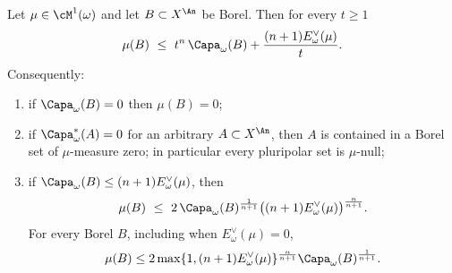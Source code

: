 \begin{proposition}
\label{prop:ch48-measure-vs-capacity}
Let $\mu\in\cM^1(\omega)$ and let $B\subset X^{\An}$ be Borel.  Then
for every $t\ge1$
\[
 \mu(B)\ \le\ t^n\,\Capa_\omega(B)+\frac{(n+1)E^\vee_\omega(\mu)}{t} .
\]
Consequently:
\begin{enumerate}
\item\label{itm:ch48-mvc:null}
      if $\Capa_\omega(B)=0$ then $\mu(B)=0$;
\item\label{itm:ch48-mvc:outer}
      if $\Capa^*_\omega(A)=0$ for an arbitrary $A\subset X^{\An}$,
      then $A$ is contained in a Borel set of $\mu$-measure zero; in
      particular every pluripolar set is $\mu$-null;
\item\label{itm:ch48-mvc:holder}
      if $\Capa_\omega(B)\le(n+1)E^\vee_\omega(\mu)$, then
      \[
       \mu(B)\ \le\ 2\,\Capa_\omega(B)^{\frac1{n+1}}
        \bigl((n+1)E^\vee_\omega(\mu)\bigr)^{\frac n{n+1}} .
      \]
      For every Borel $B$, including when $E^\vee_\omega(\mu)=0$,
      \[
       \mu(B)\le
       2\max\{1,(n+1)E^\vee_\omega(\mu)\}^{\frac n{n+1}}
       \Capa_\omega(B)^{\frac1{n+1}}.
      \]
\end{enumerate}
\end{proposition}

